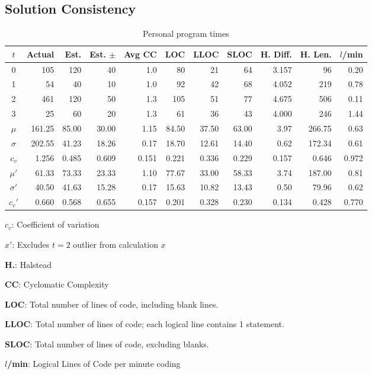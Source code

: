 \documentclass[a4paper,10pt]{article}
\begin{document}
\subsection{Solution Consistency}
  \begin{table}
  \centering
  \begin{threeparttable} 
    \begin{tabular}{|c||r|r|r||r|r|r|r|r|r||r|}
    \hline
    $t$ & Actual & Est. & Est. $\pm$ & Avg CC & LOC & LLOC & SLOC & H. Diff. & H. Len. & $l$/min \\
    \hline
0 & 105 & 120 & 40 & 1.0 & 80 & 21 & 64 & 3.157 & 96 & 0.20 \\
1 & 54 & 40 & 10 & 1.0 & 92 & 42 & 68 & 4.052 & 219 & 0.78 \\
2 & 461 & 120 & 50 & 1.3 & 105 & 51 & 77 & 4.675 & 506 & 0.11 \\
3 & 25 & 60 & 20 & 1.3 & 61 & 36 & 43 & 4.000 & 246 & 1.44 \\ \hline \hline
$\mu$ & 161.25 & 85.00 & 30.00 & 1.15 & 84.50 & 37.50 & 63.00 & 3.97 & 266.75 & 0.63 \\
$\sigma$ & 202.55 & 41.23 & 18.26 & 0.17 & 18.70 & 12.61 & 14.40 & 0.62 & 172.34 & 0.61 \\
$c_v$ & 1.256 & 0.485 & 0.609 & 0.151 & 0.221 & 0.336 & 0.229 & 0.157 & 0.646 & 0.972 \\ \hline
$\mu'$ & 61.33 & 73.33 & 23.33 & 1.10 & 77.67 & 33.00 & 58.33 & 3.74 & 187.00 & 0.81 \\
$\sigma'$ & 40.50 & 41.63 & 15.28 & 0.17 & 15.63 & 10.82 & 13.43 & 0.50 & 79.96 & 0.62 \\
$c_v'$ & 0.660 & 0.568 & 0.655 & 0.157 & 0.201 & 0.328 & 0.230 & 0.134 & 0.428 & 0.770 \\
    \hline
    \end{tabular}
    \begin{tablenotes}
     \item $c_v$: Coefficient of variation
     \item $x'$: Excludes $t=2$ outlier from calculation $x$
     \item \textbf{H.}: Halstead
     \item \textbf{CC}: Cyclomatic Complexity
     \item \textbf{LOC}: Total number of lines of code, including blank lines.
     \item \textbf{LLOC}: Total number of lines of code; each logical line contains 1 statement.
     \item \textbf{SLOC}: Total number of lines of code, excluding blanks.
     \item \textbf{$l$/min}: Logical Lines of Code per minute coding
    \end{tablenotes}
    \caption{Personal program times}
    \label{tab:complexities}
  \end{threeparttable}
  \end{table}
  
\end{document}
